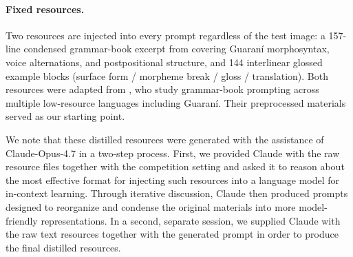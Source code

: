 \documentclass[11pt]{article}
\begin{document}
\paragraph{Fixed resources.}
Two resources are injected into every prompt regardless of the test image:
a 157-line condensed grammar-book excerpt from \citet{estigarribia2020} covering
Guaran\'{i} morphosyntax, voice alternations, and postpositional structure,
and 144 interlinear glossed example blocks
(surface form / morpheme break / gloss / translation). Both resources were adapted from \citet{aycock2025can}, who study grammar-book prompting across multiple low-resource languages including Guaraní. Their preprocessed materials served as our starting point. 

We note that these distilled resources were generated with the assistance
of Claude-Opus-4.7 in a two-step process. First, we provided Claude with the raw
resource files together with the competition setting and asked it to reason about the most effective format for injecting such resources into a language model for in-context learning. Through iterative discussion, Claude then produced prompts designed to reorganize and condense the original materials into more model-friendly representations. In a second, separate session, we supplied Claude with the raw text resources together with the generated prompt in order to produce the final distilled resources. %
\end{document}
